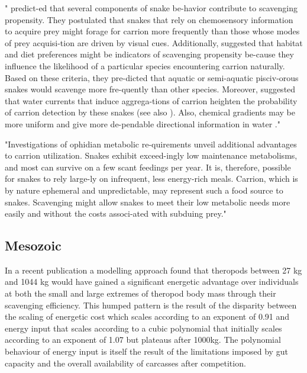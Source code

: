 \documentclass[a4paper,12pt]{article}
\begin{document}
"\cite{sazima1990necrofagia} predict-ed  that  several  components  of  snake  be-havior contribute to scavenging propensity. They  postulated  that  snakes  that  rely  on chemosensory information to acquire prey might  forage  for  carrion  more  frequently than  those  whose  modes  of  prey  acquisi-tion are driven by visual cues. Additionally, \cite{sazima1990necrofagia} suggested that habitat and diet preferences might be indicators   of   scavenging   propensity   be-cause  they  influence  the  likelihood  of  a particular  species  encountering  carrion naturally. Based on these criteria, they pre-dicted that aquatic or semi-aquatic pisciv-orous  snakes  would  scavenge  more  fre-quently than other species. Moreover, \cite{sazima1990necrofagia}   suggested that  water  currents  that  induce  aggrega-tions of carrion heighten the probability of carrion detection by these snakes (see also \cite{savitzky1992laboratory}).  Also,  chemical  gradients may  be  more  uniform  and  give  more  de-pendable  directional information in water \citep{sazima1990necrofagia}." \citep{devault2002scavenging} 



"Investigations of ophidian metabolic re-quirements unveil additional advantages to carrion  utilization.  Snakes  exhibit  exceed-ingly  low  maintenance  metabolisms,  and most  can  survive  on  a  few  scant  feedings per year. It  is, therefore, possible for snakes to rely large-ly  on  infrequent,  less  energy-rich  meals. Carrion, which is by nature ephemeral and unpredictable, may represent such a food source  to  snakes.  Scavenging  might  allow snakes to meet their low metabolic needs more  easily  and  without  the  costs  associ-ated with subduing prey." \citep{devault2002scavenging} 

\subsection*{Mesozoic}
In a recent publication a modelling approach found that theropods between 27 kg and 1044 kg would have gained a significant energetic advantage over individuals at both the small and large extremes of theropod body mass through their scavenging efficiency. 
This humped pattern is the result of the disparity between the scaling of energetic cost which scales according to an exponent of 0.91 and energy input that scales according to a cubic polynomial that initially scales according to an exponent of 1.07 but plateaus after 1000kg. 
The polynomial behaviour of energy input is itself the result of the limitations imposed by gut capacity and the overall availability of carcasses after competition.
\end{document}

